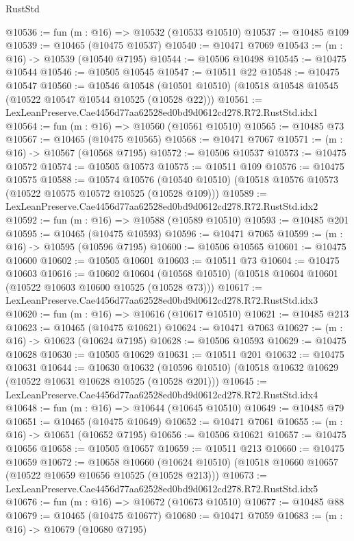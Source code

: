 \begin{lexlean}{RustStd}
\begin{coremodule}
@10536 := fun (m : @16) => @10532 (@10533 @10510)
@10537 := @10485 @109
@10539 := @10465 (@10475 @10537)
@10540 := @10471 @7069
@10543 := (m : @16) -> @10539 (@10540 @7195)
@10544 := @10506 @10498
@10545 := @10475 @10544
@10546 := @10505 @10545
@10547 := @10511 @22
@10548 := @10475 @10547
@10560 := @10546
    @10548
    (@10501 @10510)
    (@10518 @10548 @10545 (@10522 @10547 @10544 @10525 (@10528 @22)))
@10561 := LexLeanPreserve.Cae4456d77aa62528ed0bd9d0612cd278.R72.RustStd.idx1
@10564 := fun (m : @16) => @10560 (@10561 @10510)
@10565 := @10485 @73
@10567 := @10465 (@10475 @10565)
@10568 := @10471 @7067
@10571 := (m : @16) -> @10567 (@10568 @7195)
@10572 := @10506 @10537
@10573 := @10475 @10572
@10574 := @10505 @10573
@10575 := @10511 @109
@10576 := @10475 @10575
@10588 := @10574
    @10576
    (@10540 @10510)
    (@10518 @10576 @10573 (@10522 @10575 @10572 @10525 (@10528 @109)))
@10589 := LexLeanPreserve.Cae4456d77aa62528ed0bd9d0612cd278.R72.RustStd.idx2
@10592 := fun (m : @16) => @10588 (@10589 @10510)
@10593 := @10485 @201
@10595 := @10465 (@10475 @10593)
@10596 := @10471 @7065
@10599 := (m : @16) -> @10595 (@10596 @7195)
@10600 := @10506 @10565
@10601 := @10475 @10600
@10602 := @10505 @10601
@10603 := @10511 @73
@10604 := @10475 @10603
@10616 := @10602
    @10604
    (@10568 @10510)
    (@10518 @10604 @10601 (@10522 @10603 @10600 @10525 (@10528 @73)))
@10617 := LexLeanPreserve.Cae4456d77aa62528ed0bd9d0612cd278.R72.RustStd.idx3
@10620 := fun (m : @16) => @10616 (@10617 @10510)
@10621 := @10485 @213
@10623 := @10465 (@10475 @10621)
@10624 := @10471 @7063
@10627 := (m : @16) -> @10623 (@10624 @7195)
@10628 := @10506 @10593
@10629 := @10475 @10628
@10630 := @10505 @10629
@10631 := @10511 @201
@10632 := @10475 @10631
@10644 := @10630
    @10632
    (@10596 @10510)
    (@10518 @10632 @10629 (@10522 @10631 @10628 @10525 (@10528 @201)))
@10645 := LexLeanPreserve.Cae4456d77aa62528ed0bd9d0612cd278.R72.RustStd.idx4
@10648 := fun (m : @16) => @10644 (@10645 @10510)
@10649 := @10485 @79
@10651 := @10465 (@10475 @10649)
@10652 := @10471 @7061
@10655 := (m : @16) -> @10651 (@10652 @7195)
@10656 := @10506 @10621
@10657 := @10475 @10656
@10658 := @10505 @10657
@10659 := @10511 @213
@10660 := @10475 @10659
@10672 := @10658
    @10660
    (@10624 @10510)
    (@10518 @10660 @10657 (@10522 @10659 @10656 @10525 (@10528 @213)))
@10673 := LexLeanPreserve.Cae4456d77aa62528ed0bd9d0612cd278.R72.RustStd.idx5
@10676 := fun (m : @16) => @10672 (@10673 @10510)
@10677 := @10485 @88
@10679 := @10465 (@10475 @10677)
@10680 := @10471 @7059
@10683 := (m : @16) -> @10679 (@10680 @7195)

\end{coremodule}
\end{lexlean}
